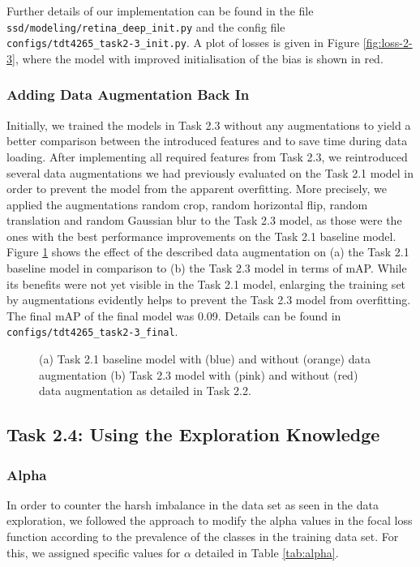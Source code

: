 \documentclass{article}
\begin{document}
Further details of our implementation can be found in the file \texttt{ssd/modeling/retina\_deep\_init.py} and the config file \texttt{configs/tdt4265\_task2-3\_init.py}. A plot of losses is given in Figure \ref{fig:loss-2-3}, where the model with improved initialisation of the bias is shown in red.


\subsubsection*{Adding Data Augmentation Back In}

Initially, we trained the models in Task 2.3 without any augmentations to yield a better comparison between the introduced features and to save time during data loading. After implementing all required features from Task 2.3, we reintroduced several data augmentations we had previously evaluated on the Task 2.1 model in order to prevent the model from the apparent overfitting. More precisely, we applied the augmentations random crop, random horizontal flip, random translation and random Gaussian blur to the Task 2.3 model, as those were the ones with the best performance improvements on the Task 2.1 baseline model. Figure \ref{fig:data_augment_comparison} shows the effect of the described data augmentation on (a) the Task 2.1 baseline model in comparison to (b) the Task 2.3 model in terms of mAP. While its benefits were not yet visible in the Task 2.1 model, enlarging the training set by augmentations evidently helps to prevent the Task 2.3 model from overfitting. The final mAP of the final model was 0.09. Details can be found in \texttt{configs/tdt4265\_task2-3\_final}.

\begin{figure}[b!]
    \centering
    \subfigure[]{}
    \subfigure[]{}
    \caption{(a) Task 2.1 baseline model with (blue) and without (orange) data augmentation (b) Task 2.3 model with (pink) and without (red) data augmentation as detailed in Task 2.2.}
    \label{fig:data_augment_comparison}
\end{figure}


\newpage
\subsection*{Task 2.4: Using the Exploration Knowledge}

\subsubsection*{Alpha}
In order to counter the harsh imbalance in the data set as seen in the data exploration, we followed the approach to modify the alpha values in the focal loss function according to the prevalence of the classes in the training data set. For this, we assigned specific values for $\alpha$ detailed in Table \ref{tab:alpha}.
\end{document}
